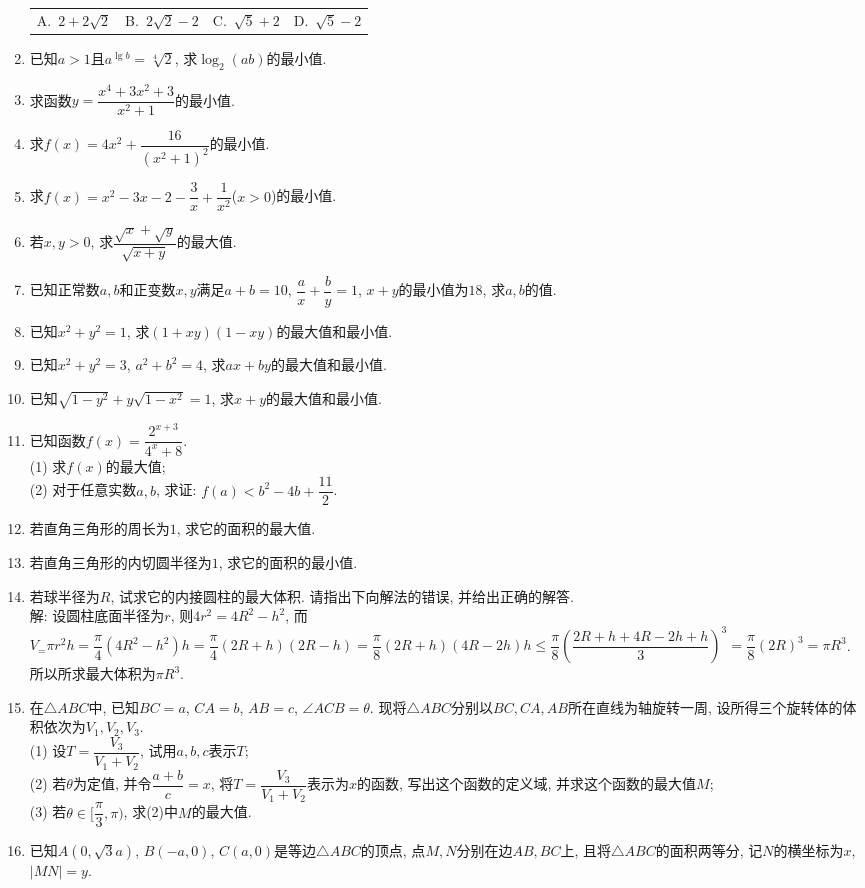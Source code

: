 \documentclass[10pt,a4paper]{article}
\newcommand{\fourch}[4]{\par\begin{tabular}{p{.23\textwidth}p{.23\textwidth}p{.23\textwidth}p{.23\textwidth}}
A.~#1 &B.~#2& C.~#3& D.~#4
\end{tabular}}
\begin{document}
\begin{enumerate}[1.]
\fourch{$2+2\sqrt 2$}{$2\sqrt 2-2$}{$\sqrt 5+2$}{$\sqrt 5-2$}
\item 已知$a>1$且$a^{\lg b}=\sqrt[4]2$, 求$\log_2(ab)$的最小值.
\item 求函数$y=\dfrac{x^4+3x^2+3}{x^2+1}$的最小值.
\item 求$f(x)=4x^2+\dfrac{16}{(x^2+1)^2}$的最小值.
\item 求$f(x)=x^2-3x-2-\dfrac 3x+\dfrac 1{x^2}$($x>0$)的最小值.
\item 若$x,y>0$, 求$\dfrac{\sqrt x+\sqrt y}{\sqrt{x+y}}$的最大值.
\item 已知正常数$a,b$和正变数$x,y$满足$a+b=10$, $\dfrac ax+\dfrac by=1$, $x+y$的最小值为$18$, 求$a,b$的值.
\item 已知$x^2+y^2=1$, 求$(1+xy)(1-xy)$的最大值和最小值.
\item 已知$x^2+y^2=3$, $a^2+b^2=4$, 求$ax+by$的最大值和最小值.
\item 已知$\sqrt{1-y^2}+y\sqrt{1-x^2}=1$, 求$x+y$的最大值和最小值.
\item 已知函数$f(x)=\dfrac{2^{x+3}}{{4^x}+8}$.\\
(1) 求$f(x)$的最大值;\\
(2) 对于任意实数$a,b$, 求证: $f(a)<b^2-4b+\dfrac{11}2$.
\item 若直角三角形的周长为$1$, 求它的面积的最大值.
\item 若直角三角形的内切圆半径为$1$, 求它的面积的最小值.
\item 若球半径为$R$, 试求它的内接圆柱的最大体积. 请指出下向解法的错误, 并给出正确的解答.\\
解: 设圆柱底面半径为$r$, 则$4r^2=4R^2-h^2$, 而$V_=\pi {r^2}h=\dfrac{\pi}4(4{R^2}-{h^2})h=\dfrac{\pi }4(2R+h)(2R-h)=\dfrac{\pi}8(2R+h)(4R-2h)h\le \dfrac{\pi}8(\dfrac{2R+h+4R-2h+h}3)^3=\dfrac{\pi}8(2R)^3=\pi R^3$. 所以所求最大体积为$\pi R^3$.
\item 在$\triangle ABC$中, 已知$BC=a$, $CA=b$, $AB=c$, $\angle ACB=\theta$. 现将$\triangle ABC$分别以$BC,CA,AB$所在直线为轴旋转一周, 设所得三个旋转体的体积依次为$V_1,V_2,V_3$.\\
(1) 设$T=\dfrac{V_3}{V_1+V_2}$, 试用$a,b,c$表示$T$;\\
(2) 若$\theta$为定值, 并令$\dfrac{a+b}c=x$, 将$T=\dfrac{V_3}{V_1+V_2}$表示为$x$的函数, 写出这个函数的定义域, 并求这个函数的最大值$M$;\\
(3) 若$\theta \in [\dfrac{\pi }3,\pi)$, 求(2)中$M$的最大值.
\item 已知$A(0,\sqrt 3a)$, $B(-a,0)$, $C(a,0)$是等边$\triangle ABC$的顶点, 点$M,N$分别在边$AB,BC$上, 且将$\triangle ABC$的面积两等分, 记$N$的横坐标为$x$, $|MN|=y$.\\

\end{enumerate}
\end{document}
